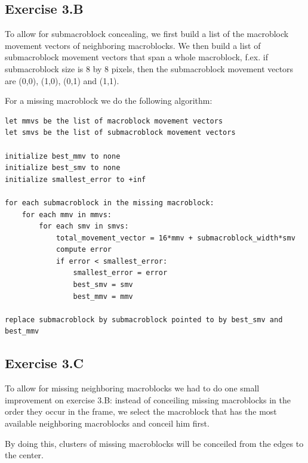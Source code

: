 \documentclass[a4paper,11pt,oneside]{article}
\begin{document}
\subsection*{Exercise 3.B}
\vspace{-0.5cm}
To allow for submacroblock concealing, we first build a list of the macroblock movement vectors of neighboring macroblocks.
We then build a list of submacroblock movement vectors that span a whole macroblock, f.ex. if submacroblock size is 8 by 8 pixels, 
then the submacroblock movement vectors are (0,0), (1,0), (0,1) and (1,1).

For a missing macroblock we do the following algorithm:
\begin{lstlisting}[frame=single]
let mmvs be the list of macroblock movement vectors
let smvs be the list of submacroblock movement vectors

initialize best_mmv to none
initialize best_smv to none
initialize smallest_error to +inf

for each submacroblock in the missing macroblock:
	for each mmv in mmvs:
		for each smv in smvs:
			total_movement_vector = 16*mmv + submacroblock_width*smv
			compute error 
			if error < smallest_error:
				smallest_error = error
				best_smv = smv
				best_mmv = mmv

replace submacroblock by submacroblock pointed to by best_smv and best_mmv
\end{lstlisting}
\vspace{-1.2cm}
\subsection*{Exercise 3.C}
\vspace{-0.5cm}
To allow for missing neighboring macroblocks we had to do one small improvement on exercise 3.B:
instead of conceiling missing macroblocks in the order they occur in the frame,
we select the macroblock that has the most available neighboring macroblocks and conceil him first.

By doing this, clusters of missing macroblocks will be conceiled from the edges to the center.
\end{document}
